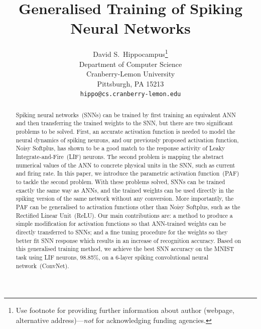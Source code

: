 \documentclass{article}
\title{Generalised Training of Spiking Neural Networks}
\author{
  David S.~Hippocampus\thanks{Use footnote for providing further
    information about author (webpage, alternative
    address)---\emph{not} for acknowledging funding agencies.} \\
  Department of Computer Science\\
  Cranberry-Lemon University\\
  Pittsburgh, PA 15213 \\
  \texttt{hippo@cs.cranberry-lemon.edu} \\
}
\begin{document}

\maketitle

\begin{abstract}
	Spiking neural networks~(SNNs) can be trained by first training an equivalent ANN and then transferring the trained weights to the SNN, but there are two significant problems to be solved.
	First, an accurate activation function is needed to model the neural dynamics of spiking neurons, and our previously proposed activation function, Noisy Softplus, has shown to be a good match to the response activity of Leaky Integrate-and-Fire~(LIF) neurons.
	The second problem is mapping the abstract numerical values of the ANN to concrete physical units in the SNN, such as current and firing rate.
	In this paper, we introduce the parametric activation function~(PAF) to tackle the second problem.
    With these problems solved, SNNs can be trained exactly the same way as ANNs, and the trained weights can be used directly in the spiking version of the same network without any conversion.
    More importantly, the PAF can be generalised to activation functions other than Noisy Softplus, such as the Rectified Linear Unit~(ReLU). %
    Our main contributions are: a method to produce a simple modification for activation functions so that ANN-trained weights can be directly transferred to SNNs; and a fine tuning procedure for the weights so they better fit SNN response which results in an increase of recognition accuracy.
    Based on this generalised training method, we achieve the best SNN accuracy on the MNIST task using LIF neurons, 98.85\%, on a 6-layer spiking convolutional neural network~(ConvNet).
    



\end{abstract}
\end{document}
